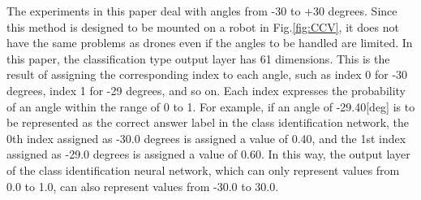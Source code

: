 The experiments in this paper deal with angles from -30 to +30 degrees. Since this method is designed to be mounted on a robot in Fig.\ref{fig:CCV}, it does not have the same problems as drones even if the angles to be handled are limited. In this paper, the classification type output layer has 61 dimensions. This is the result of assigning the corresponding index to each angle, such as index 0 for -30 degrees, index 1 for -29 degrees, and so on. Each index expresses the probability of an angle within the range of 0 to 1. For example, if an angle of -29.40[deg] is to be represented as the correct answer label in the class identification network, the 0th index assigned as -30.0 degrees is assigned a value of 0.40, and the 1st index assigned as -29.0 degrees is assigned a value of 0.60. In this way, the output layer of the class identification neural network, which can only represent values from 0.0 to 1.0, can also represent values from -30.0 to 30.0.





